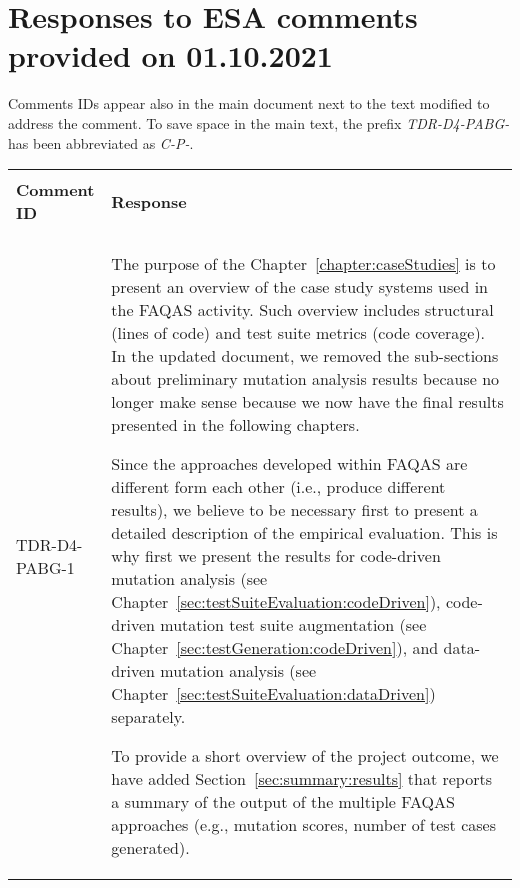 
\section{Responses to ESA comments provided on 01.10.2021}
\label{sec:ESA:comments:1}

Comments IDs appear also in the main document next to the text modified to address the comment. To save space in the main text, the prefix \emph{TDR-D4-PABG-} has been abbreviated as \emph{C-P-}.

\setlength\LTleft{0pt}
\setlength\LTright{0pt}
\tiny
\begin{longtable}{|p{2cm}|p{12cm}|@{}}
\hline
\\
\textbf{Comment ID}&\textbf{Response}\\
\\
\hline
TDR-D4-PABG-1&
\begin{minipage}{12cm}
The purpose of the Chapter~\ref{chapter:caseStudies} is to present an overview of the case study systems used in the FAQAS activity. Such overview includes structural (lines of code) and test suite metrics (code coverage). In the updated document, we removed the sub-sections about preliminary mutation analysis results because no longer make sense because we now have the final results presented in the following chapters.

Since the approaches developed within FAQAS are different form each other (i.e., produce different results), we believe to be necessary first to present a detailed description of the empirical evaluation. This is why first we present  the results for code-driven mutation analysis (see Chapter~\ref{sec:testSuiteEvaluation:codeDriven}), code-driven mutation test suite augmentation (see Chapter~\ref{sec:testGeneration:codeDriven}), and data-driven mutation analysis (see Chapter~\ref{sec:testSuiteEvaluation:dataDriven}) separately.

To provide a short overview of the project outcome, we have added Section~\ref{sec:summary:results} that reports a summary of the output of the multiple FAQAS approaches (e.g., mutation scores, number of test cases generated).


\end{minipage}
\end{longtable}
